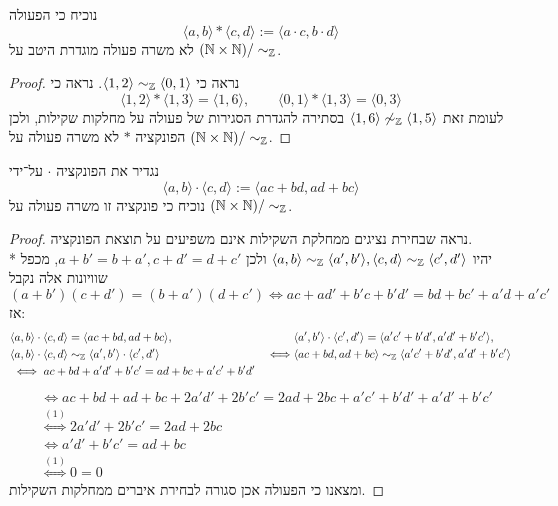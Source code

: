 \Subquestion{}
נוכיח כי הפעולה
\[
	\langle a, b \rangle * \langle c, d \rangle := \langle a \cdot c, b \cdot d \rangle
\]
לא משרה פעולה מוגדרת היטב על $(\mathbb{N} \times \mathbb{N}) / \sim_{\mathbb{Z}}$.
\begin{proof}
	נראה כי $\langle 1, 2 \rangle \sim_{\mathbb{Z}} \langle 0, 1 \rangle$. נראה כי
	\[
		\langle 1, 2\rangle * \langle 1, 3 \rangle = \langle 1, 6\rangle, 
		\qquad
		\langle 0, 1 \rangle * \langle 1, 3 \rangle = \langle 0, 3 \rangle
	\]
	לעומת זאת $\langle 1, 6 \rangle \not\sim_{\mathbb{Z}} \langle 1, 5 \rangle$ בסתירה להגדרת הסגירות של פעולה על מחלקות שקילות, ולכן הפונקציה $*$ לא משרה פעולה על $(\mathbb{N} \times \mathbb{N}) / \sim_{\mathbb{Z}}$.
\end{proof}

\Subquestion{}
נגדיר את הפונקציה $\cdot$ על־ידי
\[
	\langle a, b \rangle \cdot \langle c, d \rangle := \langle ac + bd, ad + bc \rangle
\]
נוכיח כי פונקציה זו משרה פעולה על $(\mathbb{N} \times \mathbb{N}) / \sim_{\mathbb{Z}}$.
\begin{proof}
	נראה שבחירת נציגים ממחלקת השקילות אינם משפיעים על תוצאת הפונקציה. \\*
	יהיו $\langle a, b \rangle \sim_{\mathbb{Z}} \langle a', b' \rangle, \langle c, d \rangle \sim_{\mathbb{Z}} \langle c', d' \rangle$ 
	ולכן $a + b' = b + a', c + d' = d + c'$, מכפל שוויונות אלה נקבל
	\[
		(a + b')(c + d') = (b + a')(d + c')
		\iff ac + ad' + b'c + b'd' = bd + bc' + a'd + a'c' \tag{1}
	\]
	אז:
	\begin{align*}
		& \langle a, b \rangle \cdot \langle c, d \rangle = \langle ac + bd, ad + bc \rangle,
		& & \langle a', b' \rangle \cdot \langle c', d' \rangle = \langle a'c' + b'd', a'd' + b'c' \rangle, \\
		& \langle a, b \rangle \cdot \langle c, d \rangle \sim_{\mathbb{Z}} \langle a', b' \rangle \cdot \langle c', d' \rangle
		& \iff  & \langle ac + bd, ad + bc \rangle \sim_{\mathbb{Z}} \langle a'c' + b'd', a'd' + b'c' \rangle \\
		& \iff ac + bd + a'd' + b'c' = ad + bc + a'c' + b'd'
	\end{align*}
	\begin{align*}
		& \iff ac + bd + ad + bc + 2a'd' + 2b'c' = 2ad + 2bc + a'c' + b'd' + a'd' + b'c' \\
		& \overset{(1)}{\iff} 2a'd' + 2b'c' = 2ad + 2bc \\
		& \iff a'd' + b'c' = ad + bc \\
		& \overset{(1)}{\iff} 0 = 0
	\end{align*}
	ומצאנו כי הפעולה אכן סגורה לבחירת איברים ממחלקות השקילות.
\end{proof}

